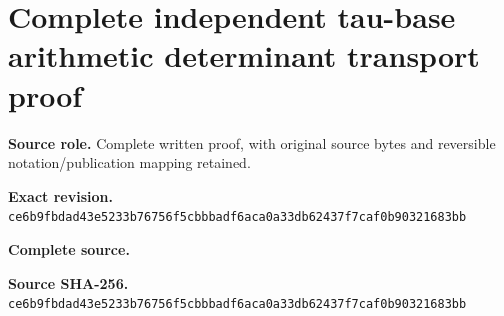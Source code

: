 \begingroup
\sloppy
\small
\section{Complete independent tau-base arithmetic determinant transport proof}
\noindent\textbf{Source role.} Complete written proof, with original source bytes and reversible notation/publication mapping retained.\par
\noindent\textbf{Exact revision.} \nolinkurl{ce6b9fbdad43e5233b76756f5cbbbadf6aca0a33db62437f7caf0b90321683bb}\par
\noindent\textbf{Complete source.} \par
\noindent\textbf{Source SHA-256.} \nolinkurl{ce6b9fbdad43e5233b76756f5cbbbadf6aca0a33db62437f7caf0b90321683bb}\par\medskip

\endgroup
